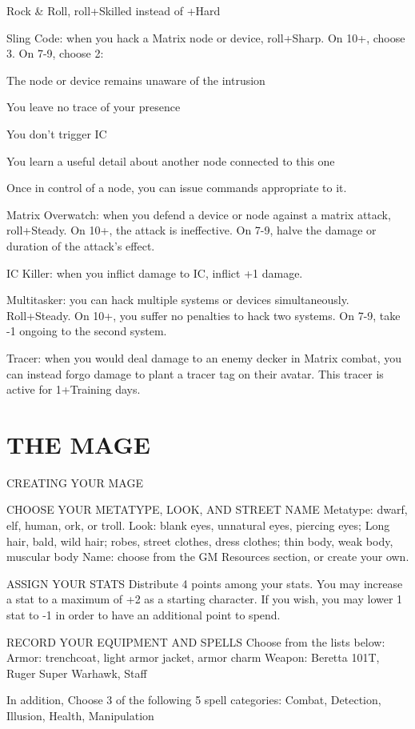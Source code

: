 Rock \& Roll, roll+Skilled instead of +Hard

Sling Code: when you hack a Matrix node or device, roll+Sharp. On 10+, choose 3. On 7-9, choose 2:

The node or device remains unaware of the intrusion

You leave no trace of your presence

You don’t trigger IC

You learn a useful detail about another node connected to this one

Once in control of a node, you can issue commands appropriate to it.

Matrix Overwatch: when you defend a device or node against a matrix attack, roll+Steady. On 10+, the attack is ineffective. On 7-9, halve the damage or duration of the attack’s effect.

IC Killer: when you inflict damage to IC, inflict +1 damage.

Multitasker: you can hack multiple systems or devices simultaneously. Roll+Steady. On 10+, you suffer no penalties to hack two systems. On 7-9, take -1 ongoing to the second system.

Tracer: when you would deal damage to an enemy decker in Matrix combat, you can instead forgo damage to plant a tracer tag on their avatar. This tracer is active for 1+Training days.



\clearpage
\section{THE MAGE}
CREATING YOUR MAGE

CHOOSE YOUR METATYPE, LOOK, AND STREET NAME
Metatype: dwarf, elf, human, ork, or troll.
Look: blank eyes, unnatural eyes, piercing eyes; Long hair, bald, wild hair; robes, street clothes, dress clothes; thin body, weak body, muscular body
Name: choose from the GM Resources section, or create your own.

ASSIGN YOUR STATS
Distribute 4 points among your stats. You may increase a stat to a maximum of +2 as a starting character. If you wish, you may lower 1 stat to -1 in order to have an additional point to spend.

RECORD YOUR EQUIPMENT AND SPELLS
Choose from the lists below:
Armor: trenchcoat, light armor jacket, armor charm
Weapon: Beretta 101T, Ruger Super Warhawk, Staff

In addition, Choose 3 of the following 5 spell categories:
Combat, Detection, Illusion, Health, Manipulation

